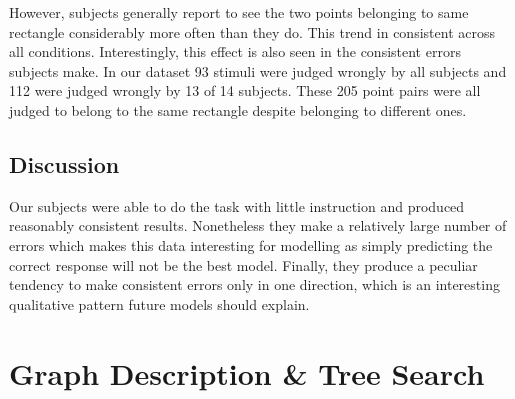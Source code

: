 \documentclass[10pt,letterpaper]{article}
\begin{document}
However, subjects generally report to see the two points belonging to same rectangle considerably more often than they do. This trend in consistent across all conditions. Interestingly, this effect is also seen in the consistent errors subjects make. In our dataset 93 stimuli were judged wrongly by all subjects and 112 were judged wrongly by 13 of 14 subjects. These 205 point pairs were all judged to belong to the same rectangle despite belonging to different ones. 



\subsection{Discussion}
Our subjects were able to do the task with little instruction and produced reasonably consistent results. Nonetheless they make a relatively large number of errors which makes this data interesting for modelling as simply predicting the correct response will not be the best model. Finally, they produce a peculiar tendency to make consistent errors only in one direction, which is an interesting qualitative pattern future models should explain.



\section{Graph Description \& Tree Search}
\end{document}
